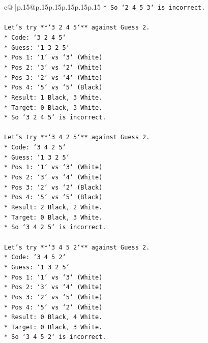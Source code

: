 \documentclass{article}
\begin{document}
{\begin{supertabular}{c@{$\;$}|p{.15\linewidth}@{}p{.15\linewidth}p{.15\linewidth}p{.15\linewidth}p{.15\linewidth}p{.15\linewidth}}
{{{\texttt{*   So `2 4 5 3` is incorrect.} \\
\\ 
\texttt{Let's try **`3 2 4 5`** against Guess 2.} \\
\texttt{*   Code: `3 2 4 5`} \\
\texttt{*   Guess: `1 3 2 5`} \\
\texttt{*   Pos 1: `1` vs `3` (White)} \\
\texttt{*   Pos 2: `3` vs `2` (White)} \\
\texttt{*   Pos 3: `2` vs `4` (White)} \\
\texttt{*   Pos 4: `5` vs `5` (Black)} \\
\texttt{*   Result: 1 Black, 3 White.} \\
\texttt{*   Target: 0 Black, 3 White.} \\
\texttt{*   So `3 2 4 5` is incorrect.} \\
\\ 
\texttt{Let's try **`3 4 2 5`** against Guess 2.} \\
\texttt{*   Code: `3 4 2 5`} \\
\texttt{*   Guess: `1 3 2 5`} \\
\texttt{*   Pos 1: `1` vs `3` (White)} \\
\texttt{*   Pos 2: `3` vs `4` (White)} \\
\texttt{*   Pos 3: `2` vs `2` (Black)} \\
\texttt{*   Pos 4: `5` vs `5` (Black)} \\
\texttt{*   Result: 2 Black, 2 White.} \\
\texttt{*   Target: 0 Black, 3 White.} \\
\texttt{*   So `3 4 2 5` is incorrect.} \\
\\ 
\texttt{Let's try **`3 4 5 2`** against Guess 2.} \\
\texttt{*   Code: `3 4 5 2`} \\
\texttt{*   Guess: `1 3 2 5`} \\
\texttt{*   Pos 1: `1` vs `3` (White)} \\
\texttt{*   Pos 2: `3` vs `4` (White)} \\
\texttt{*   Pos 3: `2` vs `5` (White)} \\
\texttt{*   Pos 4: `5` vs `2` (White)} \\
\texttt{*   Result: 0 Black, 4 White.} \\
\texttt{*   Target: 0 Black, 3 White.} \\
\texttt{*   So `3 4 5 2` is incorrect.} \\
}}}
\end{supertabular}}
\end{document}
